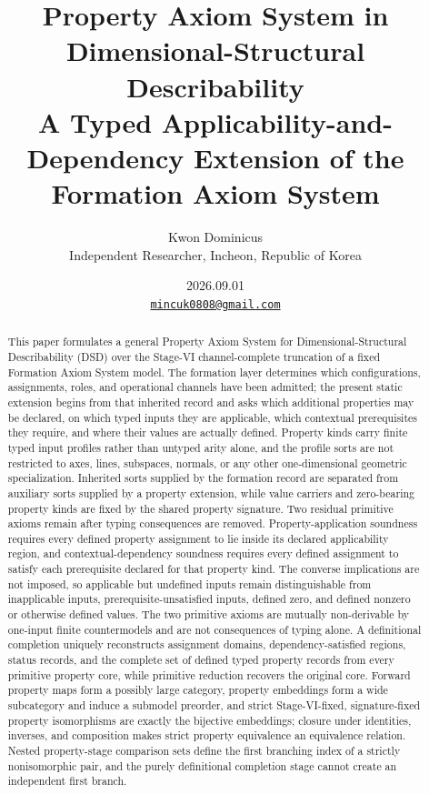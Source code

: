 \documentclass[11pt]{article}
\title{Property Axiom System in Dimensional-Structural Describability\\[0.35em]
\large A Typed Applicability-and-Dependency Extension of the Formation Axiom System}
\author{Kwon Dominicus\\\small Independent Researcher, Incheon, Republic of Korea}
\date{2026.09.01\\[0.4em]\small\href{mailto:mincuk0808@gmail.com}{\texttt{mincuk0808@gmail.com}}}
\theoremstyle{definition}
\theoremstyle{remark}
\begin{document}
\maketitle

\begin{abstract}
This paper formulates a general Property Axiom System for Dimensional-Structural Describability (DSD) over the Stage-VI channel-complete truncation of a fixed Formation Axiom System model.
The formation layer determines which configurations, assignments, roles, and operational channels have been admitted; the present static extension begins from that inherited record and asks which additional properties may be declared, on which typed inputs they are applicable, which contextual prerequisites they require, and where their values are actually defined.
Property kinds carry finite typed input profiles rather than untyped arity alone, and the profile sorts are not restricted to axes, lines, subspaces, normals, or any other one-dimensional geometric specialization.
Inherited sorts supplied by the formation record are separated from auxiliary sorts supplied by a property extension, while value carriers and zero-bearing property kinds are fixed by the shared property signature.
Two residual primitive axioms remain after typing consequences are removed.
Property-application soundness requires every defined property assignment to lie inside its declared applicability region, and contextual-dependency soundness requires every defined assignment to satisfy each prerequisite declared for that property kind.
The converse implications are not imposed, so applicable but undefined inputs remain distinguishable from inapplicable inputs, prerequisite-unsatisfied inputs, defined zero, and defined nonzero or otherwise defined values.
The two primitive axioms are mutually non-derivable by one-input finite countermodels and are not consequences of typing alone.
A definitional completion uniquely reconstructs assignment domains, dependency-satisfied regions, status records, and the complete set of defined typed property records from every primitive property core, while primitive reduction recovers the original core.
Forward property maps form a possibly large category, property embeddings form a wide subcategory and induce a submodel preorder, and strict Stage-VI-fixed, signature-fixed property isomorphisms are exactly the bijective embeddings; closure under identities, inverses, and composition makes strict property equivalence an equivalence relation.
Nested property-stage comparison sets define the first branching index of a strictly nonisomorphic pair, and the purely definitional completion stage cannot create an independent first branch.

\end{abstract}
\end{document}
